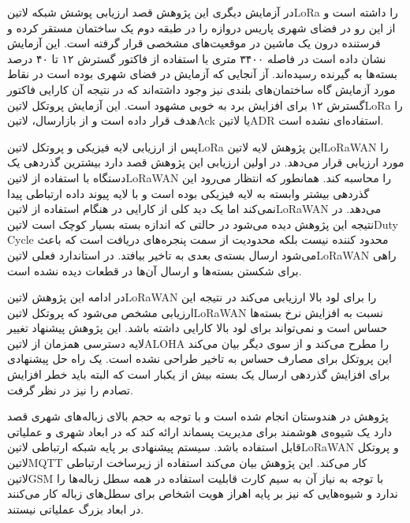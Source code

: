 در آزمایش دیگری این پژوهش قصد ارزیابی پوشش شبکه ‌لاتین{LoRa} را داشته است و از این رو در فضای شهری پاریس دروازه را در طبقه دوم یک ساختمان مستقر کرده و فرستنده
درون یک ماشین در موقعیت‌های مشخصی قرار گرفته است. این آزمایش نشان داده است در فاصله ۳۴۰۰ متری با استفاده از فاکتور گسترش ۱۲ تا ۴۰ درصد بسته‌ها به گیرنده رسیده‌اند.
آز آنجایی که آزمایش در فضای شهری بوده است در نقاط مورد آزمایش گاه ساختمان‌های بلندی نیز وجود داشته‌اند که در نتیجه آن کارایی فاکتور گسترش ۱۲ برای افزایش برد به خوبی مشهود است.
این آزمایش پروتکل ‌لاتین{LoRa} را هدف قرار داده است و از بازارسال، ‌لاتین{Ack} یا ‌لاتین{ADR} استفاده‌ای نشده است.

پس از ارزیابی لایه فیزیکی و پروتکل ‌لاتین{LoRa} این پژوهش لایه ‌لاتین{LoRaWAN} را مورد ارزیابی قرار می‌دهد. در اولین ارزیابی این پژوهش قصد دارد بیشترین گذردهی یک دستگاه
با استفاده از ‌لاتین{LoRaWAN} را محاسبه کند. همانطور که انتظار می‌رود این گذردهی بیشتر وابسته به لایه فیزیکی بوده است و با لایه پیوند داده ارتباطی پیدا نمی‌کند اما یک دید کلی از
کارایی در هنگام استفاده از ‌لاتین{LoRaWAN} می‌دهد. در نتیجه این پژوهش دیده می‌شود در حالتی که اندازه بسته بسیار کوچک است ‌لاتین{Duty Cycle} محدود کننده نیست بلکه
محدودیت از سمت پنجره‌های دریافت است که باعث می‌شود ارسال بسته‌ی بعدی به تاخیر بیافتد. در استاندارد فعلی ‌لاتین{LoRaWAN} راهی برای شکستن بسته‌ها و ارسال آن‌ها در قطعات دیده نشده است.

در ادامه این پژوهش ‌لاتین{LoRaWAN} را برای لود بالا ارزیابی می‌کند در نتیجه این ارزیابی مشخص می‌شود که پروتکل ‌لاتین{LoRaWAN} نسبت به افزایش نرخ بسته‌ها حساس است و نمی‌تواند برای لود بالا کارایی داشته باشد.
این پژوهش پیشنهاد تغییر لایه دسترسی همزمان از ‌لاتین{ALOHA} را مطرح می‌کند و از سوی دیگر بیان می‌کند این پروتکل برای مصارف حساس به تاخیر طراحی نشده است. یک راه حل پیشنهادی برای افزایش گذردهی ارسال یک بسته
بیش از یکبار است که البته باید خطر افزایش تصادم را نیز در نظر گرفت.


پژوهش  در هندوستان انجام شده است و با توجه به حجم بالای زباله‌های شهری قصد دارد یک شیوه‌ی هوشمند برای مدیریت پسماند ارائه کند که در ابعاد شهری و عملیاتی قابل استفاده باشد.
سیستم پیشنهادی بر پایه شبکه ارتباطی ‌لاتین{LoRaWAN} و پروتکل ‌لاتین{MQTT} کار می‌کند. این پژوهش بیان می‌کند استفاده از زیرساخت ارتباطی ‌لاتین{GSM} با توجه به نیاز آن به سیم کارت قابلیت
استفاده در همه سطل زباله‌ها را ندارد و شیوه‌هایی که نیز بر پایه اهراز هویت اشخاص برای سطل‌های زباله کار می‌کنند در ابعاد بزرگ عملیاتی نیستند.


